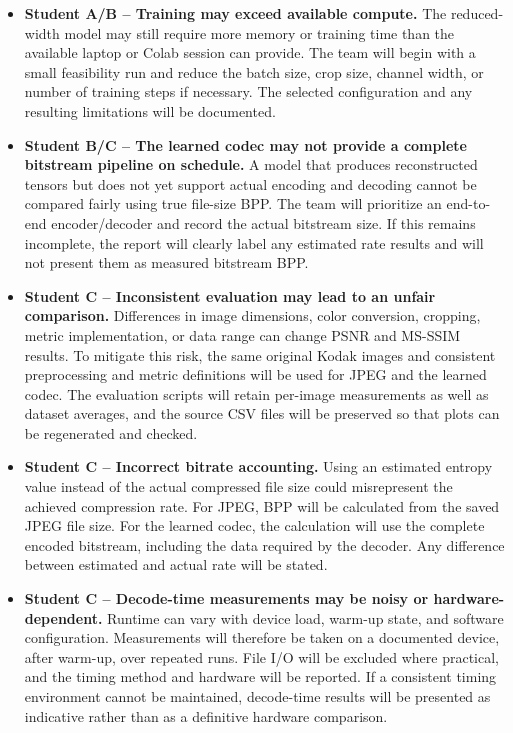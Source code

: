 \documentclass[11pt]{article}
\begin{document}
\begin{itemize}[leftmargin=*]
    \item \textbf{Student A/B -- Training may exceed available compute.}
    The reduced-width model may still require more memory or training
    time than the available laptop or Colab session can provide.
    The team will begin with a small feasibility run and reduce the
    batch size, crop size, channel width, or number of training steps
    if necessary. The selected configuration and any resulting
    limitations will be documented.

    \item \textbf{Student B/C -- The learned codec may not provide a
    complete bitstream pipeline on schedule.}
    A model that produces reconstructed tensors but does not yet
    support actual encoding and decoding cannot be compared fairly
    using true file-size BPP. The team will prioritize an end-to-end
    encoder/decoder and record the actual bitstream size. If this
    remains incomplete, the report will clearly label any estimated
    rate results and will not present them as measured bitstream BPP.

    \item \textbf{Student C -- Inconsistent evaluation may lead to an
    unfair comparison.}
    Differences in image dimensions, color conversion, cropping,
    metric implementation, or data range can change PSNR and
    MS-SSIM results. To mitigate this risk, the same original Kodak
    images and consistent preprocessing and metric definitions will
    be used for JPEG and the learned codec. The evaluation scripts
    will retain per-image measurements as well as dataset averages,
    and the source CSV files will be preserved so that plots can be
    regenerated and checked.

    \item \textbf{Student C -- Incorrect bitrate accounting.}
    Using an estimated entropy value instead of the actual compressed
    file size could misrepresent the achieved compression rate.
    For JPEG, BPP will be calculated from the saved JPEG file size.
    For the learned codec, the calculation will use the complete
    encoded bitstream, including the data required by the decoder.
    Any difference between estimated and actual rate will be stated.

    \item \textbf{Student C -- Decode-time measurements may be noisy
    or hardware-dependent.}
    Runtime can vary with device load, warm-up state, and software
    configuration. Measurements will therefore be taken on a
    documented device, after warm-up, over repeated runs. File I/O
    will be excluded where practical, and the timing method and
    hardware will be reported. If a consistent timing environment
    cannot be maintained, decode-time results will be presented as
    indicative rather than as a definitive hardware comparison.
\end{itemize}
\end{document}

